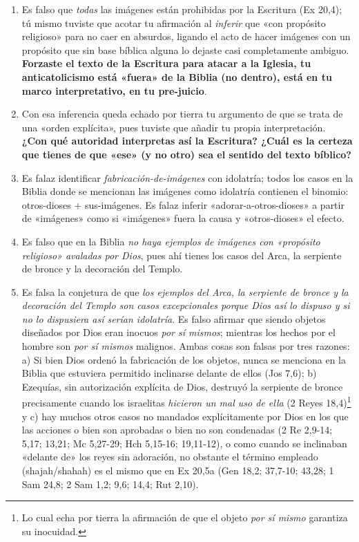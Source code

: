 \documentclass{article}
\begin{document}
\begin{enumerate}
\item
Es falso que \emph{todas} las imágenes están prohibidas por la Escritura (Ex 20,4); tú mismo tuviste que acotar tu afirmación al \emph{inferir} que «con propósito religioso» para no caer en absurdos, ligando el acto de hacer imágenes con un propósito que sin base bíblica alguna lo dejaste casi completamente ambiguo. \textbf{Forzaste el texto de la Escritura para atacar a la Iglesia, tu anticatolicismo está «fuera» de la Biblia (no dentro), está en tu marco interpretativo, en tu pre-juicio}.

\item
Con esa inferencia queda echado por tierra tu argumento de que se trata de una «orden explícita», pues tuviste que añadir tu propia interpretación. \textbf{¿Con qué autoridad interpretas así la Escritura? ¿Cuál es la certeza que tienes de que «ese» (y no otro) sea el sentido del texto bíblico?}

\item
Es falaz identificar \emph{fabricación-de-imágenes} con idolatría; todos los casos en la Biblia donde se mencionan las imágenes como idolatría contienen el binomio: otros-dioses + sus-imágenes. Es falaz inferir «adorar-a-otros-dioses» a partir de «imágenes» como si «imágenes» fuera la causa y «otros-dioses» el efecto.

\item
Es falso que en la Biblia \emph{no haya ejemplos de imágenes con «propósito religioso» avaladas por Dios}, pues ahí tienes los casos del Arca, la serpiente de bronce y la decoración del Templo.

\item
Es falsa la conjetura de que \emph{los ejemplos del Arca, la serpiente de bronce y la decoración del Templo son casos excepcionales porque Dios así lo dispuso y si no lo dispusiera así serían idolatría}. Es falso afirmar que siendo objetos diseñados por Dios eran inocuos \emph{por sí mismos}; mientras los hechos por el hombre son \emph{por sí mismos} malignos. Ambas cosas son falsas por tres razones: a) Si bien Dios ordenó la fabricación de los objetos, nunca se menciona en la Biblia que estuviera permitido inclinarse delante de ellos (Jos 7,6); b) Ezequías, sin autorización explícita de Dios, destruyó la serpiente de bronce precisamente cuando los israelitas \emph{hicieron un mal uso de ella} (2 Reyes 18,4)\footnote{Lo cual echa por tierra la afirmación de que el objeto \emph{por sí mismo} garantiza su inocuidad.} y c) hay muchos otros casos no mandados explícitamente por Dios en los que las acciones o bien son aprobadas o bien no son condenadas (2 Re 2,9-14; 5,17; 13,21; Mc 5,27-29; Hch 5,15-16; 19,11-12), o como cuando se inclinaban «delante de» los reyes sin adoración, no obstante el término empleado (shajah/shahah) es el mismo que en Ex 20,5a (Gen 18,2; 37,7-10; 43,28; 1 Sam 24,8; 2 Sam 1,2; 9,6; 14,4; Rut 2,10).


\end{enumerate}
\end{document}

